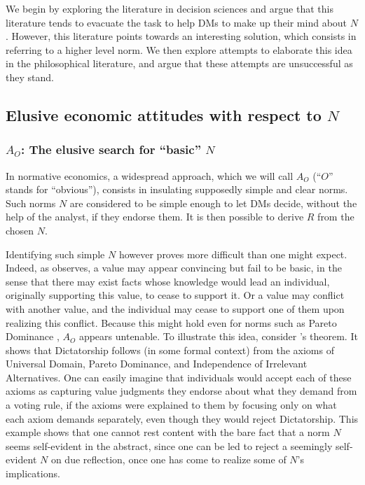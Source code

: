\documentclass[preprint, french, english, 11pt, authoryear]{elsarticle}%
\newcommand{\protectforpdf}[1]{\texorpdfstring{\ensuremath{#1}}{#1}}
\begin{document}
We begin by exploring the literature in decision sciences and argue that this literature tends to evacuate the task to help \acp{DM} to make up their mind about $N$.
However, this literature points towards an interesting solution, which consists in referring to a higher level norm.
We then explore attempts to elaborate this idea in the philosophical literature, and argue that these attempts are unsuccessful as they stand.

\subsection{Elusive economic attitudes with respect to \protectforpdf{N}}
\subsubsection{\texorpdfstring{$A_O$}{AO}: The elusive search for ``basic'' \protectforpdf{N}}
In normative economics, a widespread approach, which we will call $A_O$ (``$O$'' stands for “obvious”), consists in insulating supposedly simple and clear norms. 
Such norms $N$ are considered to be simple enough to let \acp{DM} decide, without the help of the analyst, if they endorse them. It is then possible to derive $R$ from the chosen $N$.

Identifying such simple $N$ however proves more difficult than one might expect. 
Indeed, as \citet{sen_nature_1967} observes, a value may appear convincing but fail to be basic, in the sense that there may exist facts whose knowledge would lead an individual, originally supporting this value, to cease to support it. 
Or a value may conflict with another value, and the individual may cease to support one of them upon realizing this conflict.
Because this might hold even for norms such as Pareto Dominance \citep[ch. 5 and 6]{sen_collective_1984}, $A_O$ appears untenable.
To illustrate this idea, consider \citeauthor{arrow_social_2012}’s \citeyearpar{arrow_social_2012} theorem.
It shows that Dictatorship follows (in some formal context) from the axioms of Universal Domain, Pareto Dominance, and Independence of Irrelevant Alternatives.
One can easily imagine that individuals would accept each of these axioms as capturing value judgments they endorse about what they demand from a voting rule, if the axioms were explained to them by focusing only on what each axiom demands separately, even though they would reject Dictatorship.
This example shows that one cannot rest content with the bare fact that a norm $N$ seems self-evident in the abstract, since one can be led to reject a seemingly self-evident $N$ on due reflection, once one has come to realize some of $N$'s implications.
\end{document}
